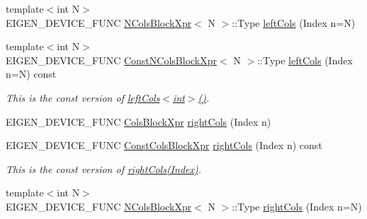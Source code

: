 \begin{DoxyCompactItemize}
{\footnotesize template$<$int N$>$ }\\E\+I\+G\+E\+N\+\_\+\+D\+E\+V\+I\+C\+E\+\_\+\+F\+U\+NC \mbox{\hyperlink{struct_eigen_1_1_dense_base_1_1_n_cols_block_xpr}{N\+Cols\+Block\+Xpr}}$<$ N $>$\+::Type \mbox{\hyperlink{class_eigen_1_1_dense_base_a1f852444684ffa51ad205f66313c873f}{left\+Cols}} (Index n=N)
\item 
\mbox{\label{class_eigen_1_1_dense_base_a38937290c1d09db06b3804a688afccde}} 
{\footnotesize template$<$int N$>$ }\\E\+I\+G\+E\+N\+\_\+\+D\+E\+V\+I\+C\+E\+\_\+\+F\+U\+NC \mbox{\hyperlink{struct_eigen_1_1_dense_base_1_1_const_n_cols_block_xpr}{Const\+N\+Cols\+Block\+Xpr}}$<$ N $>$\+::Type \mbox{\hyperlink{class_eigen_1_1_dense_base_a38937290c1d09db06b3804a688afccde}{left\+Cols}} (Index n=N) const
\begin{DoxyCompactList}\small\item\em This is the const version of \mbox{\hyperlink{class_eigen_1_1_dense_base_a51dba0f45bdf7eef96043b318380054a}{left\+Cols$<$int$>$()}}. \end{DoxyCompactList}\item 
E\+I\+G\+E\+N\+\_\+\+D\+E\+V\+I\+C\+E\+\_\+\+F\+U\+NC \mbox{\hyperlink{class_eigen_1_1_block}{Cols\+Block\+Xpr}} \mbox{\hyperlink{class_eigen_1_1_dense_base_a5b0fa44c191d40a2f82260f7e5cdeaa9}{right\+Cols}} (Index n)
\item 
\mbox{\label{class_eigen_1_1_dense_base_abdc2ab442b235d3f12ae95c33b3775b1}} 
E\+I\+G\+E\+N\+\_\+\+D\+E\+V\+I\+C\+E\+\_\+\+F\+U\+NC \mbox{\hyperlink{class_eigen_1_1_block}{Const\+Cols\+Block\+Xpr}} \mbox{\hyperlink{class_eigen_1_1_dense_base_abdc2ab442b235d3f12ae95c33b3775b1}{right\+Cols}} (Index n) const
\begin{DoxyCompactList}\small\item\em This is the const version of \mbox{\hyperlink{class_eigen_1_1_dense_base_a5b0fa44c191d40a2f82260f7e5cdeaa9}{right\+Cols(\+Index)}}. \end{DoxyCompactList}\item 
{\footnotesize template$<$int N$>$ }\\E\+I\+G\+E\+N\+\_\+\+D\+E\+V\+I\+C\+E\+\_\+\+F\+U\+NC \mbox{\hyperlink{struct_eigen_1_1_dense_base_1_1_n_cols_block_xpr}{N\+Cols\+Block\+Xpr}}$<$ N $>$\+::Type \mbox{\hyperlink{class_eigen_1_1_dense_base_a5f6341e6fd02fa2a7304a0933d01c866}{right\+Cols}} (Index n=N)

\end{DoxyCompactItemize}
